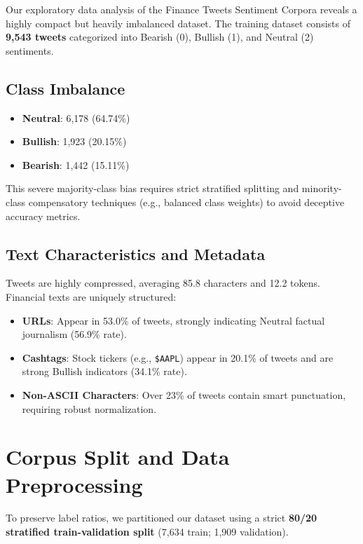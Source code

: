 \documentclass[11pt,a4paper]{article}
\begin{document}
Our exploratory data analysis of the Finance Tweets Sentiment Corpora reveals a highly compact but heavily imbalanced dataset. 
The training dataset consists of \textbf{9,543 tweets} categorized into Bearish (0), Bullish (1), and Neutral (2) sentiments.

\subsection{Class Imbalance}
\begin{itemize}[noitemsep]
    \item \textbf{Neutral}: 6,178 (64.74\%)
    \item \textbf{Bullish}: 1,923 (20.15\%)
    \item \textbf{Bearish}: 1,442 (15.11\%)
\end{itemize}

This severe majority-class bias requires strict stratified splitting and minority-class compensatory techniques (e.g., balanced class weights) to avoid deceptive accuracy metrics.

\subsection{Text Characteristics and Metadata}
Tweets are highly compressed, averaging 85.8 characters and 12.2 tokens. Financial texts are uniquely structured:
\begin{itemize}[noitemsep]
    \item \textbf{URLs}: Appear in 53.0\% of tweets, strongly indicating Neutral factual journalism (56.9\% rate).
    \item \textbf{Cashtags}: Stock tickers (e.g., \texttt{\$AAPL}) appear in 20.1\% of tweets and are strong Bullish indicators (34.1\% rate).
    \item \textbf{Non-ASCII Characters}: Over 23\% of tweets contain smart punctuation, requiring robust normalization.
\end{itemize}

\section{Corpus Split and Data Preprocessing}

To preserve label ratios, we partitioned our dataset using a strict \textbf{80/20 stratified train-validation split} (7,634 train; 1,909 validation).
\end{document}
